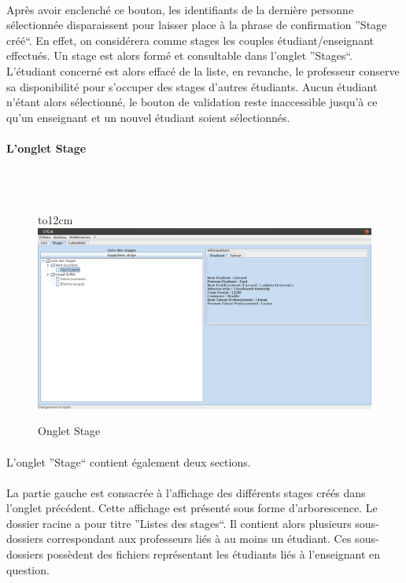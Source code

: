 \documentclass[a4paper,10pt]{report}
\begin{document}
	    \paragraph{}
	      Après avoir enclenché ce bouton, les identifiants de la dernière personne sélectionnée disparaissent pour laisser place à la phrase de confirmation ''Stage créé``.
	      En effet, on considérera comme stages les couples étudiant/enseignant effectués.
	      Un stage est alors formé et consultable dans l'onglet ''Stages``. 
	      L'étudiant concerné est alors effacé de la liste, en revanche, le professeur conserve sa disponibilité pour s'occuper des stages d'autres étudiants.
	      Aucun étudiant n'étant alors sélectionné, le bouton de validation reste inaccessible jusqu'à ce qu'un enseignant et un nouvel étudiant soient sélectionnés.
	      
	      \newpage
	  \paragraph{L'onglet Stage}
	  ~\\~\\
	      \begin{figure}[H]
		\hbox to12cm{\hss\includegraphics[width=16cm]{Stage.png}\hss}
		\caption{Onglet Stage}
	      \end{figure}
	  
	 
	      \paragraph{}
		L'onglet ''Stage`` contient également deux sections.
		
		
		
	      \paragraph{}
		La partie gauche est consacrée à l'affichage des différents stages créés dans l'onglet précédent.
		Cette affichage est présenté sous forme d'arborescence.
		Le dossier racine a pour titre ''Listes des stages``.
		Il contient alors plusieurs sous-dossiers correspondant aux professeurs liés à au moins un étudiant.
		Ces sous-dossiers possèdent des fichiers représentant les étudiants liés à l'enseignant en question.
		
\end{document}
